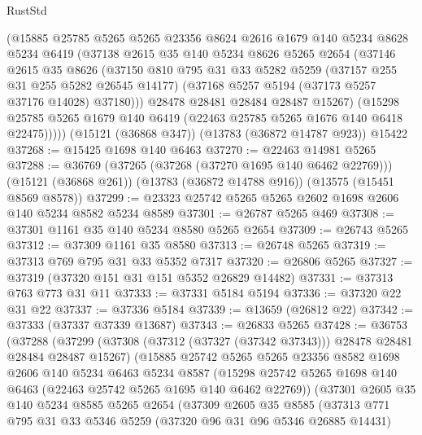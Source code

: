 \begin{lexlean}{RustStd}
\begin{coremodule}
        (@15885
          @25785
          @5265
          @5265
          @23356
          @8624
          @2616
          @1679
          @140
          @5234
          @8628
          @5234
          @6419
          (@37138
            @2615
            @35
            @140
            @5234
            @8626
            @5265
            @2654
            (@37146
              @2615
              @35
              @8626
              (@37150
                @810
                @795
                @31
                @33
                @5282
                @5259
                (@37157 @255 @31 @255 @5282 @26545 @14177)
                (@37168 @5257 @5194 (@37173 @5257 @37176 @14028) @37180)))
            @28478
            @28481
            @28484
            @28487
            @15267)
          (@15298 @25785 @5265 @1679 @140 @6419 (@22463 @25785 @5265 @1676 @140 @6418 @22475)))))
    (@15121 (@36868 @347))
    (@13783 (@36872 @14787 @923))
    @15422
@37268 := @15425 @1698 @140 @6463
@37270 := @22463 @14981 @5265
@37288 := @36769
    (@37265 (@37268 (@37270 @1695 @140 @6462 @22769)))
    (@15121 (@36868 @261))
    (@13783 (@36872 @14788 @916))
    (@13575 (@15451 @8569 @8578))
@37299 := @23323 @25742 @5265 @5265 @2602 @1698 @2606 @140 @5234 @8582 @5234 @8589
@37301 := @26787 @5265 @469
@37308 := @37301 @1161 @35 @140 @5234 @8580 @5265 @2654
@37309 := @26743 @5265
@37312 := @37309 @1161 @35 @8580
@37313 := @26748 @5265
@37319 := @37313 @769 @795 @31 @33 @5352 @7317
@37320 := @26806 @5265
@37327 := @37319 (@37320 @151 @31 @151 @5352 @26829 @14482)
@37331 := @37313 @763 @773 @31 @11
@37333 := @37331 @5184 @5194
@37336 := @37320 @22 @31 @22
@37337 := @37336 @5184
@37339 := @13659 (@26812 @22)
@37342 := @37333 (@37337 @37339 @13687)
@37343 := @26833 @5265
@37428 := @36753
    (@37288
      (@37299
        (@37308 (@37312 (@37327 (@37342 @37343))) @28478 @28481 @28484 @28487 @15267)
        (@15885
          @25742
          @5265
          @5265
          @23356
          @8582
          @1698
          @2606
          @140
          @5234
          @6463
          @5234
          @8587
          (@15298 @25742 @5265 @1698 @140 @6463 (@22463 @25742 @5265 @1695 @140 @6462 @22769))
          (@37301
            @2605
            @35
            @140
            @5234
            @8585
            @5265
            @2654
            (@37309
              @2605
              @35
              @8585
              (@37313
                @771
                @795
                @31
                @33
                @5346
                @5259
                (@37320 @96 @31 @96 @5346 @26885 @14431)

\end{coremodule}
\end{lexlean}
